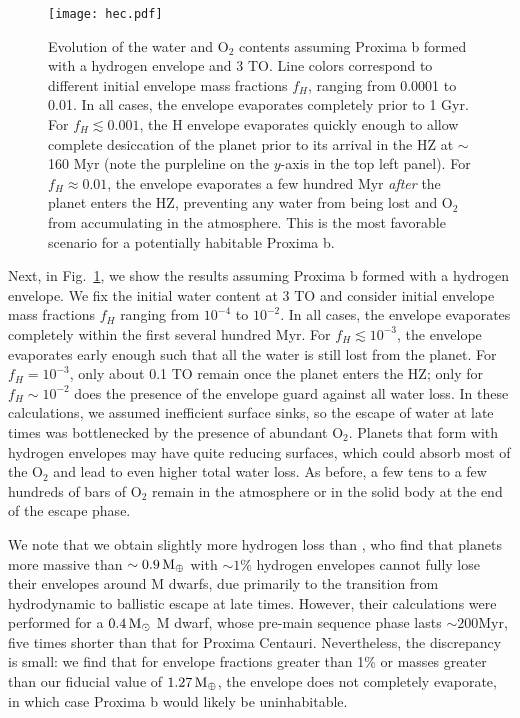 \documentclass[preprint,12pt]{aastex}
\def\mearth{{\rm\,M_\oplus}}
\def\msun{{\rm\,M_\odot}}
\begin{document}
\begin{figure}[ht]
\centering
\texttt{[image: hec.pdf]}
\caption{Evolution of the water and O$_2$ contents assuming Proxima b
  formed with a hydrogen envelope and 3 TO. Line colors correspond to
  different initial envelope mass fractions $f_H$, ranging from 0.0001
  to 0.01. In all cases, the envelope evaporates completely prior to 1
  Gyr. For $f_H \lesssim 0.001$, the H envelope evaporates quickly
  enough to allow complete desiccation of the planet prior to its
  arrival in the HZ at $\sim$ 160 Myr (note the purpleline on the $y$-axis in the top left panel). For $f_H \approx 0.01$, the
  envelope evaporates a few hundred Myr \emph{after} the planet enters
  the HZ, preventing any water from being lost and O$_2$ from
  accumulating in the atmosphere.  This is the most favorable scenario
  for a potentially habitable Proxima b.}
\label{fig:atmesc:hec}
\end{figure}

Next, in Fig.~\ref{fig:atmesc:hec}, we show the results assuming
Proxima b formed with a hydrogen envelope. We fix the initial water
content at 3 TO and consider initial envelope mass fractions $f_H$
ranging from $10^{-4}$ to $10^{-2}$. In all cases, the envelope
evaporates completely within the first several hundred Myr. For $f_H
\lesssim 10^{-3}$, the envelope evaporates early enough such that all
the water is still lost from the planet. For $f_H = 10^{-3}$, only
about 0.1 TO remain once the planet enters the HZ; only for $f_H \sim
10^{-2}$ does the presence of the envelope guard against all water
loss. In these calculations, we assumed inefficient surface sinks, so
the escape of water at late times was bottlenecked by the presence of
abundant O$_2$. Planets that form with hydrogen envelopes may have
quite reducing surfaces, which could absorb most of the O$_2$ and lead
to even higher total water loss. As before, a few tens to a few
hundreds of bars of O$_2$ remain in the atmosphere or in the solid
body at the end of the escape phase.

We note that we obtain slightly more hydrogen loss than
\cite{OwenMohanty16}, who find that planets more massive than $\sim
0.9 \mearth$ with $\sim 1\%$ hydrogen envelopes cannot fully lose
their envelopes around M dwarfs, due primarily to the transition from
hydrodynamic to ballistic escape at late times. However, their
calculations were performed for a $0.4 \msun$ M dwarf, whose pre-main
sequence phase lasts $\sim 200 \mathrm{Myr}$, five times shorter than
that for Proxima Centauri. Nevertheless, the discrepancy is small: we
find that for envelope fractions greater than 1\% or masses greater
than our fiducial value of $1.27 \mearth$, the envelope does not
completely evaporate, in which case Proxima b would likely be
uninhabitable.
\end{document}
